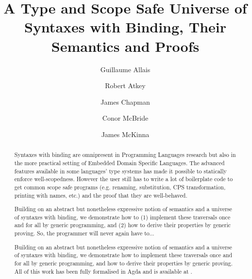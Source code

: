 \documentclass[format=acmsmall, review=true, anonymous, screen=true]{acmart}
\begin{document}
\title[A Type and Scope Safe Universe of Syntaxes with Binding]{A Type and Scope Safe Universe of Syntaxes with Binding, Their Semantics and Proofs}
\author{Guillaume Allais}
\author{Robert Atkey}
\author{James Chapman}
\author{Conor McBride}
\author{James McKinna}

\begin{abstract}
Syntaxes with binding are omnipresent in Programming Languages
research but also in the more practical setting of Embedded
Domain Specific Languages. The advanced features available in
some languages' type systems has made it possible to statically
enforce well-scopedness. However the user still has to write a
lot of boilerplate code to get common scope safe programs (e.g.
renaming, substitution, CPS transformation, printing with names,
etc.) and the proof that they are well-behaved.

Building on an abstract but nonetheless expressive notion of
semantics and a universe of syntaxes with binding, we demonstrate
how to (1) implement these traversals once and for all by generic
programming, and (2) how to derive their properties by generic proving.
So, the programmer will never again have to...

Building on an abstract but nonetheless expressive notion of
semantics and a universe of syntaxes with binding, we demonstrate
how to implement these traversals once and for all by generic
programming, and how to derive their properties by generic proving.
All of this work has been fully formalised in Agda and is available
at .
\end{abstract}


%
%
\begin{CCSXML}

\end{CCSXML}

\end{document}
